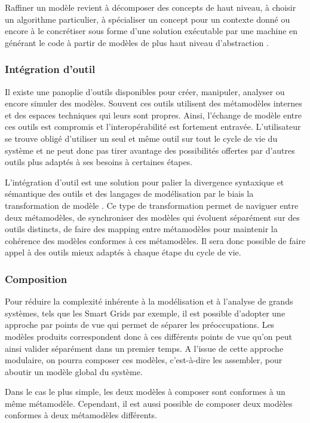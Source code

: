 Raffiner un modèle revient à décomposer des concepts de haut niveau, à choisir 
un algorithme particulier, à spécialiser un concept pour un contexte donné ou 
encore à le concrétiser sous forme d'une solution exécutable par une machine en 
générant le code à partir de modèles de plus haut niveau d'abstraction 
\cite{czarnecki2000intentional}. 

\subsubsection{Intégration d'outil}

Il existe une panoplie d'outils disponibles pour créer, manipuler, analyser ou 
encore simuler des modèles. Souvent ces outils utilisent des métamodèles 
internes et des espaces techniques qui leurs sont propres. Ainsi, l'échange de 
modèle entre ces outils est compromis et l'interopérabilité est fortement 
entravée. L'utilisateur se trouve obligé d'utiliser un seul et même outil sur 
tout le cycle de vie du système et ne peut donc pas tirer avantage des 
possibilités offertes par d'autres outils plus adaptés à ses besoins à certaines 
étapes.

L'intégration d'outil est une solution pour palier la divergence syntaxique et 
sémantique des outils et des langages de modélisation par le biais la 
transformation de modèle \cite{tratt2005model}. Ce type de transformation permet 
de naviguer entre deux métamodèles, de synchroniser des modèles qui évoluent 
séparément sur des outils distincts, de faire des mapping entre métamodèles pour 
maintenir la cohérence des modèles conformes à ces métamodèles. Il sera donc 
possible de faire appel à des outils mieux adaptés à chaque étape du cycle de 
vie.

\subsubsection{Composition}

Pour réduire la complexité inhérente à la modélisation et à l'analyse de grands 
systèmes, tels que les Smart Grids par exemple, il est possible d'adopter une 
approche par points de vue qui permet de séparer les préoccupations. Les modèles 
produits correspondent donc à ces différents points de vue qu'on peut ainsi 
valider séparément dans un premier temps. A l'issue de cette approche modulaire, 
on pourra composer ces modèles, c'est-à-dire les assembler, pour aboutir un 
modèle global du système.

Dans le cas le plus simple, les deux modèles à composer sont conformes à un même 
métamodèle. Cependant, il est aussi possible de composer deux modèles conformes 
à deux métamodèles différents. 

